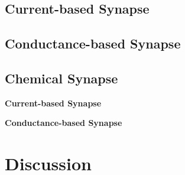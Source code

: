 \subsection{Current-based Synapse}


\subsection{Conductance-based Synapse}

\subsection{Chemical Synapse}

 \textbf{Current-based Synapse}


\textbf{Conductance-based Synapse}


\section{Discussion}


